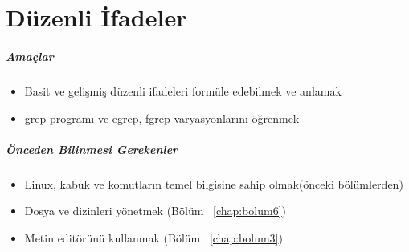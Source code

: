 \chapter{Düzenli İfadeler}
\label{chap:bolum7}
\paragraph{Amaçlar}
\begin{itemize}
 \item Basit ve gelişmiş düzenli ifadeleri formüle edebilmek ve anlamak
 \item grep programı ve egrep, fgrep varyasyonlarını öğrenmek
 \end{itemize}
\paragraph{Önceden Bilinmesi Gerekenler}
\begin{itemize}
 \item Linux, kabuk ve komutların temel bilgisine sahip olmak(önceki bölümlerden)
 \item Dosya ve dizinleri yönetmek (Bölüm ~\ref{chap:bolum6})
 \item Metin editörünü kullanmak (Bölüm ~\ref{chap:bolum3})
 \end{itemize}
